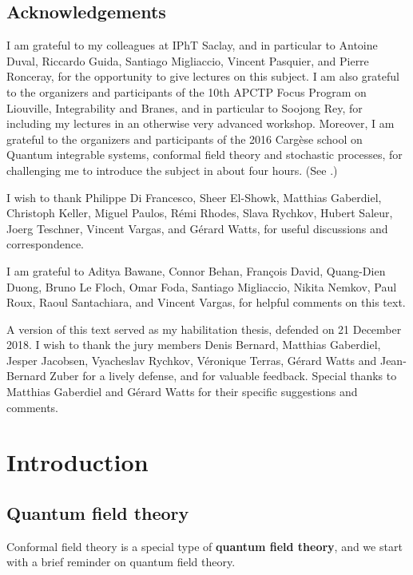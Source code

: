 \documentclass[12pt, a4paper, notitlepage, twoside]{report}
\numberwithin{equation}{section}
\theoremstyle{break}
\begin{document}
\section{Acknowledgements}

I am grateful to my colleagues at IPhT Saclay, and in particular to Antoine Duval, Riccardo Guida, Santiago Migliaccio, Vincent Pasquier, and Pierre Ronceray, for the opportunity to give lectures on this subject. I am also grateful to the organizers and participants of the 10th APCTP Focus Program on Liouville, Integrability and Branes, and in particular to Soojong Rey, for including my lectures in an otherwise very advanced workshop. Moreover, I am grateful to the organizers and participants of the 2016 Carg\`ese school on Quantum integrable systems, conformal field theory and stochastic processes, for challenging me to introduce the subject in about four hours. (See \cite{rib16}.) 

I wish to thank Philippe Di Francesco, Sheer El-Showk, Matthias Gaberdiel, Christoph Keller, Miguel Paulos, R\'emi Rhodes, Slava Rychkov, Hubert Saleur, Joerg Teschner, Vincent Vargas, and G\'erard Watts, for useful discussions and correspondence.

I am grateful to Aditya Bawane, Connor Behan, Fran\c{c}ois David, Quang-Dien Duong, Bruno Le Floch, Omar Foda, Santiago Migliaccio, Nikita Nemkov, Paul Roux, Raoul Santachiara, and Vincent Vargas, for helpful comments on this text.

A version of this text served as my habilitation thesis, defended on 21 December 2018. I wish to thank the jury members Denis Bernard, Matthias Gaberdiel, Jesper Jacobsen, Vyacheslav Rychkov, V\'eronique Terras, G\'erard Watts and Jean-Bernard Zuber for a lively defense, and for valuable feedback. Special thanks to Matthias Gaberdiel and G\'erard Watts for their specific suggestions and comments.


\chapter{Introduction \label{secintr}}

\section{Quantum field theory \label{secqft} }

Conformal field theory is a special type of \textbf{\boldmath quantum field theory}, and we start with a brief reminder on quantum field theory.
\end{document}
